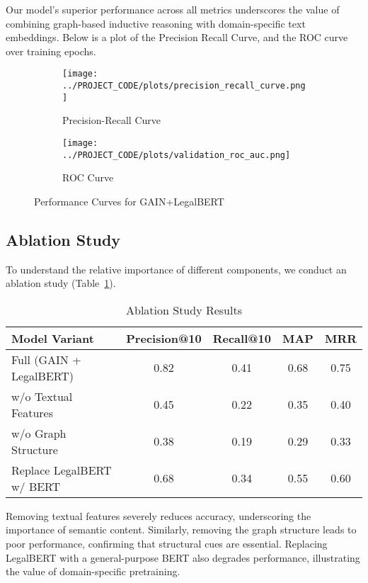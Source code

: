 \documentclass{article}
\begin{document}
Our model’s superior performance across all metrics underscores the value of combining graph-based inductive reasoning with domain-specific text embeddings. Below is a plot of the Precision Recall Curve, and the ROC curve over training epochs.

\begin{figure}[H]
    \centering
    \begin{subfigure}{0.45\textwidth}
        \centering
        \texttt{[image: ../PROJECT\_CODE/plots/precision\_recall\_curve.png]}
        \caption{Precision-Recall Curve}
    \end{subfigure}
    \begin{subfigure}{0.45\textwidth}
        \centering
        \texttt{[image: ../PROJECT\_CODE/plots/validation\_roc\_auc.png]}
        \caption{ROC Curve}
    \end{subfigure}
    \caption{Performance Curves for GAIN+LegalBERT}
\end{figure}

\subsection{Ablation Study}
To understand the relative importance of different components, we conduct an ablation study (Table~\ref{tab:ablation}).

\begin{table}[H]
    \centering
    \caption{Ablation Study Results}
    \label{tab:ablation}
    \begin{tabular}{lcccc}
    \toprule
    \textbf{Model Variant} & \textbf{Precision@10} & \textbf{Recall@10} & \textbf{MAP} & \textbf{MRR} \\
    \midrule
    Full (GAIN + LegalBERT) & 0.82 & 0.41 & 0.68 & 0.75 \\
    w/o Textual Features & 0.45 & 0.22 & 0.35 & 0.40 \\
    w/o Graph Structure & 0.38 & 0.19 & 0.29 & 0.33 \\
    Replace LegalBERT w/ BERT & 0.68 & 0.34 & 0.55 & 0.60 \\
    \bottomrule
    \end{tabular}
\end{table}

Removing textual features severely reduces accuracy, underscoring the importance of semantic content. Similarly, removing the graph structure leads to poor performance, confirming that structural cues are essential. Replacing LegalBERT with a general-purpose BERT also degrades performance, illustrating the value of domain-specific pretraining.
\end{document}

